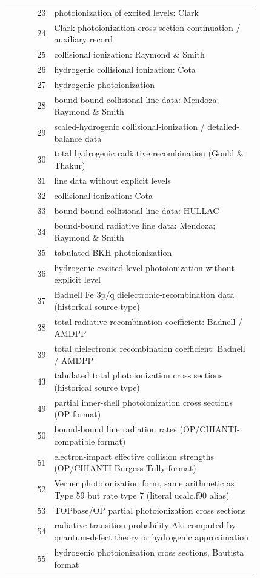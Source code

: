 \documentclass[
  10pt,
]{article}
\begin{document}
\begin{longtable}[]{@{}r p{0.82\linewidth}@{}}
23 & photoionization of excited levels: Clark \\
24 & Clark photoionization cross-section continuation / auxiliary record \\
25 & collisional ionization: Raymond \& Smith \\
26 & hydrogenic collisional ionization: Cota \\
27 & hydrogenic photoionization \\
28 & bound-bound collisional line data: Mendoza; Raymond \& Smith \\
29 & scaled-hydrogenic collisional-ionization / detailed-balance data \\
30 & total hydrogenic radiative recombination (Gould \& Thakur) \\
31 & line data without explicit levels \\
32 & collisional ionization: Cota \\
33 & bound-bound collisional line data: HULLAC \\
34 & bound-bound radiative line data: Mendoza; Raymond \& Smith \\
35 & tabulated BKH photoionization \\
36 & hydrogenic excited-level photoionization without explicit level \\
37 & Badnell Fe 3p/q dielectronic-recombination data (historical source type) \\
38 & total radiative recombination coefficient: Badnell / AMDPP \\
39 & total dielectronic recombination coefficient: Badnell / AMDPP \\
43 & tabulated total photoionization cross sections (historical source type) \\
49 & partial inner-shell photoionization cross sections (OP format) \\
50 & bound-bound line radiation rates (OP/CHIANTI-compatible format) \\
51 & electron-impact effective collision strengths (OP/CHIANTI Burgess-Tully format) \\
52 & Verner photoionization form, same arithmetic as Type 59 but rate type 7 (literal ucalc.f90 alias) \\
53 & TOPbase/OP partial photoionization cross sections \\
54 & radiative transition probability Aki computed by quantum-defect theory or hydrogenic approximation \\
55 & hydrogenic photoionization cross sections, Bautista format \\

\end{longtable}
\end{document}
